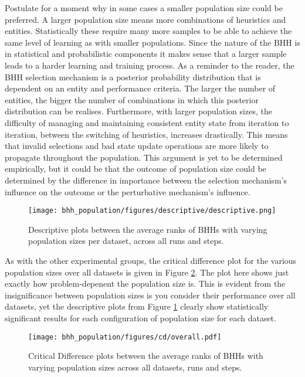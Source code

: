 Postulate for a moment why in some cases a smaller population size could be preferred. A larger population size means more combinations of heuristics and entities. Statistically these require many more samples to be able to achieve the same level of learning as with smaller populations. Since the nature of the \Ac{BHH} is in statistical and probabilistic components it makes sense that a larger sample leads to a harder learning and training process. As a reminder to the reader, the \ac{BHH} selection mechanism is a posterior probability distribution that is dependent on an entity and performance criteria. The larger the number of entities, the bigger the number of combinations in which this posterior distribution can be realises. Furthermore, with larger population sizes, the difficulty of managing and maintaining consistent entity state from iteration to iteration, between the switching of heuristics, increases drastically. This means that invalid selections and bad state update operations are more likely to propagate throughout the population. This argument is yet to be determined empirically, but it could be that the outcome of population size could be determined by the difference in importance between the selection mechanism's influence on the outcome or the perturbative mechanism's influence.


\begin{figure}[htbp]
	\centering
	\texttt{[image: bhh\_population/figures/descriptive/descriptive.png]}
	\caption{Descriptive plots between the average ranks of \Acsp{BHH} with varying population sizes per dataset, across all runs and steps.}
	\label{fig:results:population:descriptive:descriptive}
\end{figure}

As with the other experimental groups, the critical difference plot for the various population sizes over all datasets is given in Figure \ref{fig:results:population:descriptive:cd}. The plot here shows just exactly how problem-depenent the population size is. This is evident from the insignificance between population sizes is you consider their performance over all datasets, yet the descriptive plots from Figure \ref{fig:results:population:descriptive:descriptive} clearly show statistically significant results for each configuration of population size for each dataset.

\begin{figure}[htbp]
	\centering
	\texttt{[image: bhh\_population/figures/cd/overall.pdf]}
	\caption{Critical Difference plots between the average ranks of \Acsp{BHH} with varying population sizes across all datasets, runs and steps.}
	\label{fig:results:population:descriptive:cd}
\end{figure}

